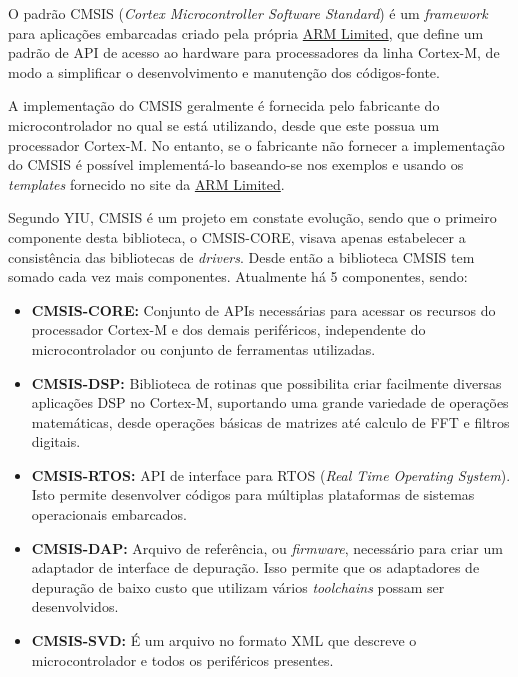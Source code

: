 O padrão CMSIS (\emph{Cortex Microcontroller Software Standard}) é um \emph{framework} para aplicações embarcadas criado pela própria \href{http://infocenter.arm.com/help/index.jsp}{ARM Limited}, que define um padrão de API de acesso ao hardware para processadores da linha Cortex-M, de modo a simplificar o desenvolvimento e manutenção dos códigos-fonte.

A implementação do CMSIS geralmente é fornecida pelo fabricante do microcontrolador no qual se está utilizando, desde que este possua um processador Cortex-M. No entanto, se o fabricante não fornecer a implementação do CMSIS é possível implementá-lo baseando-se nos exemplos e usando os \emph{templates} fornecido no site da \href{http://www.arm.com/products/processors/cortex-m/cortex-microcontroller-software-interface-standard.php}{ARM Limited}.

Segundo YIU\cite{ARMGUIDE}, CMSIS é um projeto em constate evolução, sendo que o primeiro componente desta biblioteca, o  CMSIS-CORE, visava apenas estabelecer a consistência das bibliotecas de \emph{drivers}. Desde então a biblioteca CMSIS tem somado cada vez mais componentes. Atualmente há 5 componentes, sendo: 

\begin{itemize}
	\item \textbf{CMSIS-CORE:} Conjunto de APIs necessárias para acessar os recursos do processador Cortex-M e dos demais periféricos, independente do microcontrolador ou conjunto de ferramentas utilizadas.
	
	\item \textbf{CMSIS-DSP:} Biblioteca de rotinas que possibilita criar facilmente diversas aplicações DSP no Cortex-M, suportando uma grande variedade de operações matemáticas, desde operações básicas de matrizes até calculo de FFT e filtros digitais. 
	
	\item \textbf{CMSIS-RTOS:} API de interface para RTOS (\emph{Real Time Operating System}). Isto permite desenvolver códigos para múltiplas plataformas de sistemas operacionais embarcados.
	
	\item \textbf{CMSIS-DAP:} Arquivo de referência, ou \emph{firmware}, necessário para criar um adaptador de interface de depuração. Isso permite que os adaptadores de depuração de baixo custo que utilizam vários \emph{toolchains} possam ser desenvolvidos.
	
	\item \textbf{CMSIS-SVD:} É um arquivo no formato XML que descreve o microcontrolador e todos os periféricos presentes.
\end{itemize}

